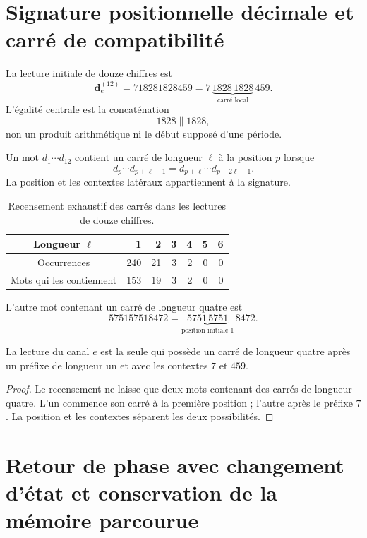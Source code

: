 \section{Signature positionnelle décimale et carré de compatibilité}

La lecture initiale de douze chiffres est
\[
 \mathbf d_e^{(12)}
 =718281828459
 =7\,\underbrace{1828\,1828}_{\text{carré local}}\,459.
\]
L’égalité centrale est la concaténation
\[
 1828\mathbin{\|}1828,
\]
non un produit arithmétique ni le début supposé d’une période.

\begin{definition}
Un mot \(d_1\cdots d_{12}\) contient un carré de longueur \(\ell\)
à la position \(p\) lorsque
\[
 d_p\cdots d_{p+\ell-1}
 =d_{p+\ell}\cdots d_{p+2\ell-1}.
\]
La position et les contextes latéraux appartiennent à la signature.
\end{definition}

\begin{table}[htbp]
\centering
\caption{Recensement exhaustif des carrés dans les lectures de douze chiffres.}
\label{gfp:b:tab:censo-cuadrados-e}
\begin{tabular}{c*{6}{r}}
\toprule
Longueur \(\ell\)&1&2&3&4&5&6\\
\midrule
Occurrences&240&21&3&2&0&0\\
Mots qui les contiennent&153&19&3&2&0&0\\
\bottomrule
\end{tabular}
\end{table}

L’autre mot contenant un carré de longueur quatre est
\[
 575157518472
 =\underbrace{5751\,5751}_{\text{position initiale }1}\,8472.
\]

\begin{proposition}
\label{gfp:b:prop:cuadrado-posicional-e}
La lecture du canal \(e\) est la seule qui possède un carré de longueur
quatre après un préfixe de longueur un et avec les contextes \(7\) et \(459\).
\end{proposition}

\begin{proof}
Le recensement ne laisse que deux mots contenant des carrés de longueur quatre. L’un
commence son carré à la première position ; l’autre après le préfixe \(7\). La
position et les contextes séparent les deux possibilités.
\end{proof}

\section{Retour de phase avec changement d’état et conservation de la mémoire parcourue}

